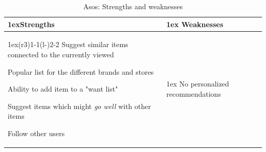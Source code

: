 

\begin{table}[H]
    \centering
    \begin{tabularx}{\linewidth}{>{\parskip1ex}X@{\kern4\tabcolsep}>{\parskip1ex}X}
        \toprule
        \hfil\bfseries Strengths
        &
        \hfil\bfseries Weaknesses
        \\\cmidrule(r{3\tabcolsep}){1-1}\cmidrule(l{-\tabcolsep}){2-2}
        Suggest similar items connected to the currently viewed \par
        Popular list for the different brands and stores \par
        Ability to add item to a "want list" \par
        Suggest items which might \emph{go well} with other items \par
        Follow other users \par
        &
        No personalized recommendations \par
        \\\bottomrule
    \end{tabularx}
    \caption{Asos: Strengths and weaknesses}
    \label{table:ecommerceMallzees}
\end{table}

